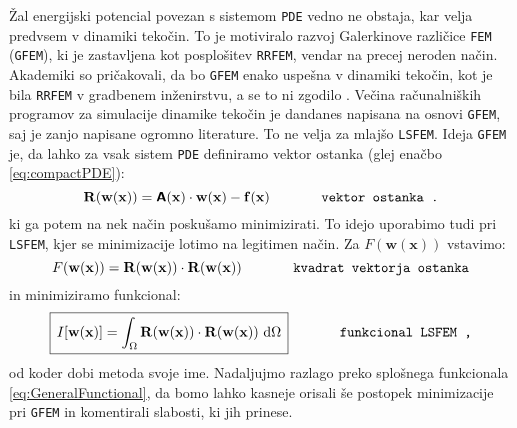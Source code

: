 Žal energijski potencial povezan s sistemom \texttt{PDE} vedno ne obstaja, kar velja predvsem v dinamiki tekočin. To je motiviralo razvoj Galerkinove različice \texttt{FEM} (\texttt{GFEM}), ki je zastavljena kot posplošitev \texttt{RRFEM}, vendar na precej neroden način. Akademiki so pričakovali, da bo \texttt{GFEM} enako uspešna v dinamiki tekočin, kot je bila \texttt{RRFEM} v gradbenem inženirstvu, a se to ni zgodilo \cite{JiangB-LSFEM}. Večina računalniških programov za simulacije dinamike tekočin je dandanes napisana na osnovi \texttt{GFEM}, saj je zanjo napisane ogromno literature. To ne velja za mlajšo \texttt{LSFEM}. Ideja \texttt{GFEM} je, da lahko za vsak sistem \texttt{PDE} definiramo vektor ostanka (glej enačbo \eqref{eq:compactPDE}):
\begin{equation}
	\mathbf{R(w(x))} = \bm{\mathsf{A}}(\mathbf{x}) \cdot \mathbf{w(x)} - \mathbf{f(x)} \hspace{1.3cm} \texttt{vektor ostanka .}
	\label{eq:residual}
\end{equation}
ki ga potem na nek način poskušamo minimizirati. To idejo uporabimo tudi pri \texttt{LSFEM}, kjer se minimizacije lotimo na legitimen način. Za $F(\mathbf{w(x)})$ vstavimo:
\begin{equation}
	F(\mathbf{w(x)}) = \mathbf{R(w(x))} \cdot \mathbf{R(w(x))} \hspace{1.3cm} \texttt{kvadrat vektorja ostanka}
\end{equation}
in minimiziramo funkcional:
\begin{equation}
	\boxed{\, I[\mathbf{w(x)}] = \int_{\Omega} \mathbf{R(w(x))} \cdot \mathbf{R(w(x))} \ \mathrm{d} \Omega \,} \hspace{1.3cm} \texttt{funkcional LSFEM ,}
\end{equation}
od koder dobi metoda svoje ime. Nadaljuj\-mo razlago preko splošnega funkcionala \eqref{eq:GeneralFunctional}, da bomo lahko kasneje orisali še postopek minimizacije pri \texttt{GFEM} in komentirali slabosti, ki jih prinese.


